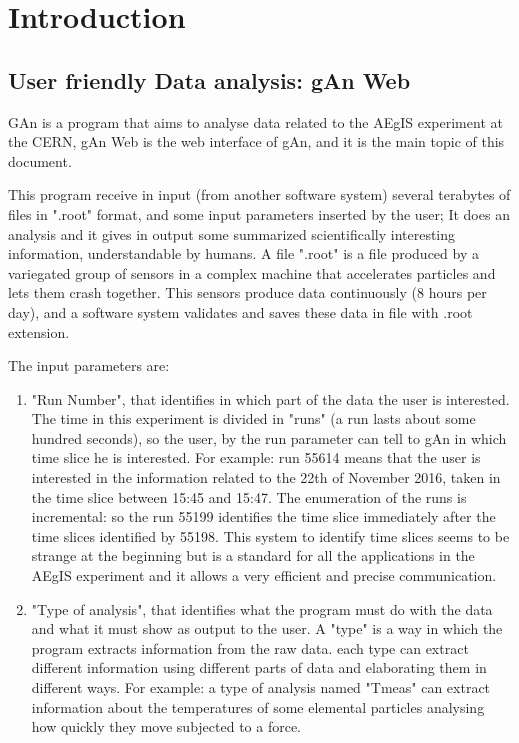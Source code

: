 
\chapter{Introduction} %

\label{Chapter1} %


\section{User friendly Data analysis: gAn Web}

GAn is a program that aims to analyse data related to the AEgIS experiment at the CERN, gAn Web is the web interface of gAn, and it is the main topic of this document.
 
This program receive in input (from another software system) several terabytes of files in ".root" format, and some input parameters inserted by the user; 
It does an analysis and it gives in output some summarized scientifically interesting information, understandable by humans.   
A file ".root" is a file produced by a variegated group of sensors in a complex machine that accelerates particles and lets them crash together. This sensors produce data continuously (8 hours per day), and a software system validates and saves these data in file with .root extension. 

The input parameters are:
\begin{enumerate}

\item "Run Number", that identifies in which part of the data the user is interested. 
The time in this experiment is divided in "runs" (a run lasts about some hundred seconds), so the user, by the run parameter can tell to gAn in which time slice he is interested. For example: run 55614 means that the user is interested in the information related to the 22th of November 2016, taken in the time slice between 15:45 and 15:47. The enumeration of the runs is incremental: so the run 55199 identifies the time slice immediately after the time slices identified by 55198. This system to identify time slices seems to be strange at the beginning but is a standard for all the applications in the AEgIS experiment and it allows a very efficient and precise communication.
 

\item "Type of analysis", that identifies what the program must do with the data and what it must show as output to the user.
A "type" is a way in which the program extracts information from the raw data. each type can extract different information using different parts of data and elaborating them in different ways. For example: a type of analysis named "Tmeas" can extract information about the temperatures of some elemental particles analysing how quickly they move subjected to a force. 

\end{enumerate}


